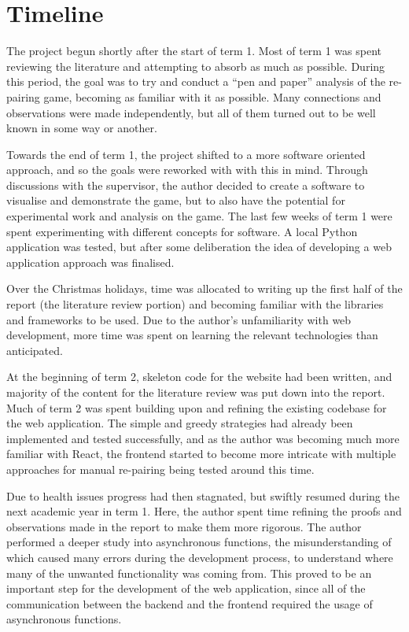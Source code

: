 \section{Timeline}

The project begun shortly after the start of term 1. Most of term 1 was spent reviewing the literature and attempting to absorb as much as possible. During this period, the goal was to try and conduct a ``pen and paper'' analysis of the re-pairing game, becoming as familiar with it as possible. Many connections and observations were made independently, but all of them turned out to be well known in some way or another. 

Towards the end of term 1, the project shifted to a more software oriented approach, and so the goals were reworked with with this in mind. Through discussions with the supervisor, the author decided to create a software to visualise and demonstrate the game, but to also have the potential for experimental work and analysis on the game. The last few weeks of term 1 were spent experimenting with different concepts for software. A local Python application was tested, but after some deliberation the idea of developing a web application approach was finalised. 

Over the Christmas holidays, time was allocated to writing up the first half of the report (the literature review portion) and becoming familiar with the libraries and frameworks to be used. Due to the author's unfamiliarity with web development, more time was spent on learning the relevant technologies than anticipated. 

At the beginning of term 2, skeleton code for the website had been written, and majority of the content for the literature review was put down into the report. Much of term 2 was spent building upon and refining the existing codebase for the web application. The simple and greedy strategies had already been implemented and tested successfully, and as the author was becoming much more familiar with React, the frontend started to become more intricate with multiple approaches for manual re-pairing being tested around this time. 

Due to health issues progress had then stagnated, but swiftly resumed during the next academic year in term 1. Here, the author spent time refining the proofs and observations made in the report to make them more rigorous. The author performed a deeper study into asynchronous functions, the misunderstanding of which caused many errors during the development process, to understand where many of the unwanted functionality was coming from. This proved to be an important step for the development of the web application, since all of the communication between the backend and the frontend required the usage of asynchronous functions.

